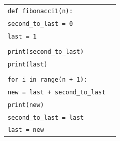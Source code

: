 \documentclass[t,handout,9pt]{beamer}
\begin{document}
\begin{frame}
	\vfill
		\begin{table}[]
		  \begin{flushleft}
		  \begin{tabular}{ll}
		  \texttt{def fibonacci1(n):} &  \\
		  \texttt{\quad second\_to\_last = 0}        & \\
		  \texttt{\quad last = 1 }        & \\
		  \texttt{} &  \\
		  \texttt{\quad print(second\_to\_last)}        & \\
		  \texttt{\quad print(last)}        & \\
		  \texttt{} &  \\
		  \texttt{\quad for i in range(n + 1):} &  \\
		  \texttt{\quad\quad new = last + second\_to\_last} &  \\
		  \texttt{\quad\quad print(new)} &  \\
		  \texttt{\quad\quad second\_to\_last = last} &  \\
		  \texttt{\quad\quad last = new  } &  \\
		  \end{tabular}
		  \end{flushleft}
		\end{table}
	\vfill
\end{frame}
\end{document}
